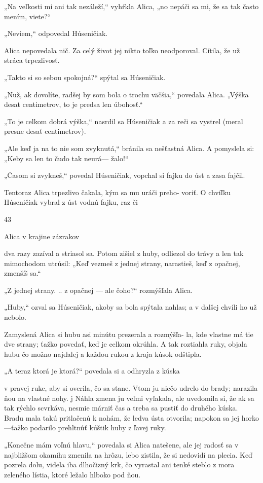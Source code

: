 \documentclass[12pt]{article}
\begin{document}
\begin{Parallel}[p]{}{}
{{„Na veľkosti mi ani tak nezáleží,“ vyhŕkla Alica, „no
nepáči sa mi, že sa tak často mením, viete?“

„Neviem,“ odpovedal Húseničiak.

Alica nepovedala nič. Za celý život jej nikto toľko
neodporoval. Cítila, že už stráca trpezlivosť.

„Takto si so sebou spokojná?“ spýtal sa Húseničiak.

„Nuž, ak dovolíte, radšej by som bola o trochu väčšia,“
povedala Alica. „Výška desat centimetrov, to je predsa len
úbohosť.“

„To je celkom dobrá výška,“ nasrdil sa Húseničiak a za
reči sa vystrel (meral presne desať centimetrov).

„Ale keď ja na to nie som zvyknutá,“ bránila sa nešťastná
Alica. A pomyslela si: „Keby sa len to čudo tak neurá—
žalo!“

„Časom si zvykneš,“ povedal Húseničiak, vopchal si fajku
do úst a zasa fajčil.

Tentoraz Alica trpezlivo čakala, kým sa mu uráči preho-
voriť. O chvíľku Húseničiak vybral z úst vodnú fajku, raz či

43

Alica v krajine zázrakov

dva razy zazíval a striasol sa. Potom zišiel z huby, odliezol do
trávy a len tak mimochodom utrúsil: „Keď vezmeš z jednej
strany, narastieš, keď z opačnej, zmenšíš sa.“

„Z jednej strany. .. z opačnej — ale čoho?“ rozmýšľala
Alica.

„Huby,“ ozval sa Húseničiak, akoby sa bola spýtala
nahlas; a v ďalšej chvíli ho už nebolo.

Zamyslená Alica si hubu asi minútu prezerala a rozmýšľa-
la, kde vlastne má tie dve strany; ťažko povedať, keď je
celkom okrúhla. A tak roztiahla ruky, objala hubu čo možno
najďalej a každou rukou z kraja kúsok odštipla.

„A teraz ktorá je ktorá?“ povedala si a odhryzla z kúska

v pravej ruke, aby si overila, čo sa stane. Vtom ju niečo
udrelo do brady; narazila ňou na vlastné nohy.
j Náhla zmena ju veľmi vyľakala, ale uvedomila si, že ak sa
tak rýchlo scvrkáva, nesmie márniť čas a treba sa pustiť do
druhého kúska. Bradu mala takú pritlačenú k nohám, že
ledva ústa otvorila; napokon sa jej horko—ťažko podarilo
prehltnúť kúštik huby z ľavej ruky.

„Konečne mám voľnú hlavu,“ povedala si Alica natešene,
ale jej radosť sa v najbližšom okamihu zmenila na hrôzu,
lebo zistila, že si nedovidí na plecia. Keď pozrela dolu, videla
iba dlhočizný krk, čo vyrastal ani tenké steblo z mora
zeleného lístia, ktoré ležalo hlboko pod ňou.

}}
\end{Parallel}
\end{document}
